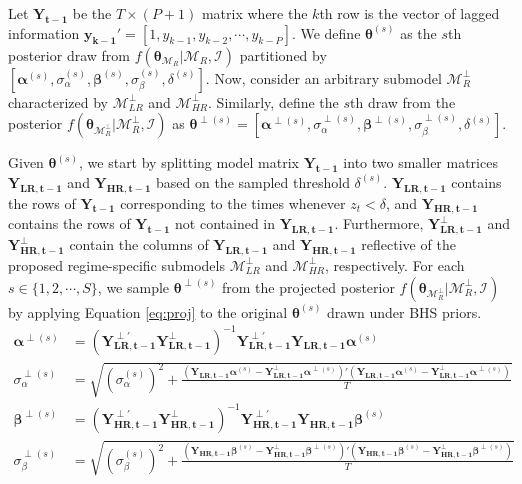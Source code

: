Let $\bm{Y_{t-1}}$ be the $T\times(P+1)$ matrix where the $k$th row is the vector of lagged information $\bm{y_{k-1}}'=[1,y_{k-1},y_{k-2},\cdots,y_{k-P}]$. We define $\bm{\theta}^{(s)}$ as the $s$th posterior draw from $f(\bm{\theta}_{\mathcal{M}_R}|\mathcal{M}_R,\mathcal{I})$ partitioned by $[\bm{\alpha}^{(s)},\sigma_\alpha^{(s)},\bm{\beta}^{(s)},\sigma_\beta^{(s)},\delta^{(s)}]$. Now, consider an arbitrary submodel $\mathcal{M}^\perp_{R}$ characterized by  $\mathcal{M}^\perp_{LR}$ and $\mathcal{M}^\perp_{HR}$. Similarly, define the $s$th draw from the posterior $f(\bm{\theta}_{\mathcal{M}^\perp_R}|\mathcal{M}^\perp_R,\mathcal{I})$  as $\bm{\theta}^{\perp(s)}=[\bm{\alpha}^{\perp(s)},\sigma_\alpha^{\perp(s)},\bm{\beta}^{\perp(s)},\sigma_\beta^{\perp(s)},\delta^{(s)}]$.  
 
Given $\bm{\theta}^{(s)}$, we start by splitting model matrix $\bm{Y_{t-1}}$ into two smaller matrices $\bm{Y_{LR,t-1}}$ and $\bm{Y_{HR,t-1}}$ based on the sampled threshold $\delta^{(s)}$. $\bm{Y_{LR,t-1}}$ contains the rows of $\bm{Y_{t-1}}$ corresponding to the times whenever $z_t<\delta$, and $\bm{Y_{HR,t-1}}$ contains the rows of  $\bm{Y_{t-1}}$ not contained in $\bm{Y_{LR,t-1}}$. Furthermore, $\bm{Y^{\perp}_{LR,t-1}}$ and $\bm{Y^{\perp}_{HR,t-1}}$ contain the columns of $\bm{Y_{LR,t-1}}$ and $\bm{Y_{HR,t-1}}$ reflective of the proposed regime-specific submodels $\mathcal{M}^\perp_{LR}$ and $\mathcal{M}^\perp_{HR}$, respectively. For each $s \in \{1,2,\cdots,S\}$, we sample $\bm{\theta}^{\perp(s)}$ from the  projected posterior $f(\bm{\theta}_{\mathcal{M}^\perp_R}|\mathcal{M}^\perp_R,\mathcal{I})$ by applying Equation \ref{eq:proj} to the original $\bm{\theta}^{(s)}$ drawn under BHS priors.
\begin{equation}
\label{eq:proj}
\begin{split}
\bm{\alpha}^{\perp(s)}&=(\bm{Y^{\perp'}_{LR,t-1}}\bm{Y^{\perp}_{LR,t-1}})^{-1} \bm{Y^{\perp'}_{LR,t-1}}     \bm{Y_{LR,t-1}}\bm{\alpha}^{(s)}\\
\sigma_\alpha^{\perp(s)}&=\sqrt{(\sigma_\alpha^{(s)})^2+\frac{( \bm{Y_{LR,t-1}}\bm{\alpha}^{(s)}-\bm{Y^\perp_{LR,t-1}}\bm{\alpha}^{\perp(s)})'( \bm{Y_{LR,t-1}}\bm{\alpha}^{(s)}-\bm{Y^\perp_{LR,t-1}}\bm{\alpha}^{\perp(s)})}{T}                                  }\\
\bm{\beta}^{\perp(s)}&=(\bm{Y^{\perp'}_{HR,t-1}}\bm{Y^{\perp}_{HR,t-1}})^{-1} \bm{Y^{\perp'}_{HR,t-1}} \bm{Y_{HR,t-1}}\bm{\beta}^{(s)}\\
\sigma_\beta^{\perp(s)}&=\sqrt{(\sigma_\beta^{(s)})^2+\frac{( \bm{Y_{HR,t-1}}\bm{\beta}^{(s)}-\bm{Y^\perp_{HR,t-1}}\bm{\beta}^{\perp(s)})'( \bm{Y_{HR,t-1}}\bm{\beta}^{(s)}-\bm{Y^\perp_{HR,t-1}}\bm{\beta}^{\perp(s)})}{T}                                   }
\end{split}
\end{equation}

